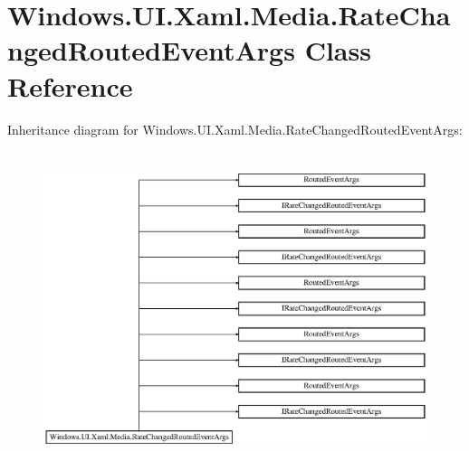 \hypertarget{class_windows_1_1_u_i_1_1_xaml_1_1_media_1_1_rate_changed_routed_event_args}{}\section{Windows.\+U\+I.\+Xaml.\+Media.\+Rate\+Changed\+Routed\+Event\+Args Class Reference}
\label{class_windows_1_1_u_i_1_1_xaml_1_1_media_1_1_rate_changed_routed_event_args}
Inheritance diagram for Windows.\+U\+I.\+Xaml.\+Media.\+Rate\+Changed\+Routed\+Event\+Args\+:\begin{figure}[H]
\begin{center}
\leavevmode
\includegraphics[height=9.221557cm]{class_windows_1_1_u_i_1_1_xaml_1_1_media_1_1_rate_changed_routed_event_args}
\end{center}
\end{figure}
